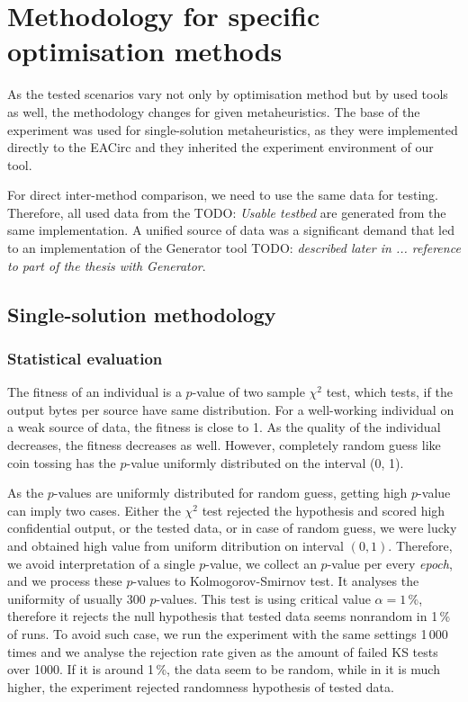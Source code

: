 \documentclass[
  print, %
  Table,   %
  nolof,     %
  nolot,     %
  11pt, %
  oneside  %
]{fithesis3}
\newcommand{\todo}[1]{TODO: \textit{#1}}
\begin{document}
\section{Methodology for specific optimisation methods}
\label{sec:method-spec}

As the tested scenarios vary not only by optimisation method but by used tools as well, the methodology changes for given metaheuristics. The base of the experiment was used for single-solution metaheuristics, as they were implemented directly to the EACirc and they inherited the experiment environment of our tool.

For direct inter-method comparison, we need to use the same data for testing. Therefore, all used data from the \todo{Usable testbed} are generated from the same implementation. A unified source of data was a significant demand that led to an implementation of the Generator tool \todo{described later in ... reference to part of the thesis with Generator}.

\subsection{Single-solution methodology}
\label{subsec:method-spec-ss}

\subsubsection{Statistical evaluation}
\label{subsubsec:method-spec-ss-stat}

The fitness of an individual is a $p$-value of two sample $\chi^{2}$ test, which tests, if the output bytes per source have same distribution. For a well-working individual on a weak source of data, the fitness is close to 1. As the quality of the individual decreases, the fitness decreases as well. However, completely random guess like coin tossing has the $p$-value uniformly distributed on the interval (0, 1).

As the $p$-values are uniformly distributed for random guess, getting high $p$-value can imply two cases. Either the $\chi^{2}$ test rejected the hypothesis and scored high confidential output, or the tested data, or in case of random guess, we were lucky and obtained high value from uniform ditribution on interval $(0, 1)$. Therefore, we avoid interpretation of a single $p$-value, we collect an $p$-value per every \textit{epoch}, and we process these $p$-values to Kolmogorov-Smirnov test. It analyses the uniformity of usually 300 $p$-values. This test is using critical value $\alpha = 1\,\%$, therefore it rejects the null hypothesis that tested data seems nonrandom in 1\,\% of runs. To avoid such case, we run the experiment with the same settings 1\,000 times and we analyse the rejection rate given as the amount of failed KS tests over 1000. If it is around 1\,\%, the data seem to be random, while in it is much higher, the experiment rejected randomness hypothesis of tested data.
\end{document}
